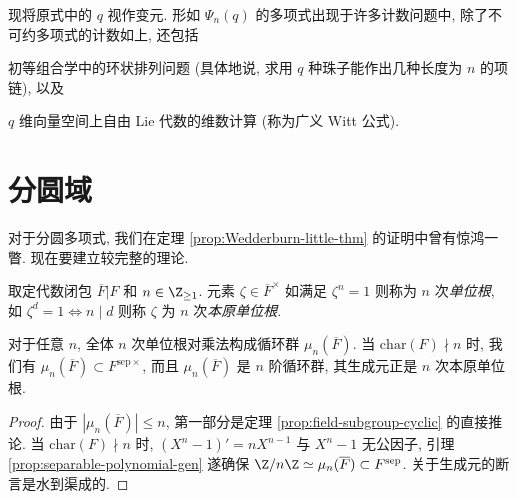 现将原式中的 $q$ 视作变元. 形如 $\Psi_n(q)$ 的多项式出现于许多计数问题中, 除了不可约多项式的计数如上, 还包括
\begin{inparaenum}[(a)]
	\item 初等组合学中的环状排列问题 (具体地说, 求用 $q$ 种珠子能作出几种长度为 $n$ 的项链), 以及
	\item $q$ 维向量空间上自由 Lie 代数的维数计算 (称为广义 Witt 公式).
\end{inparaenum}

\section{分圆域}\label{sec:cyclotomic-ext}
对于分圆多项式, 我们在定理 \ref{prop:Wedderburn-little-thm} 的证明中曾有惊鸿一瞥. 现在要建立较完整的理论.

\begin{definition}
	取定代数闭包 $\overline{F}|F$ 和 $n \in \Z_{\geq 1}$. 元素 $\zeta \in \overline{F}^\times$ 如满足 $\zeta^n = 1$ 则称为 $n$ 次\emph{单位根}, 如 $\zeta^d = 1 \iff n \mid d$ 则称 $\zeta$ 为 $n$ 次\emph{本原单位根}.
\end{definition}

\begin{proposition}
	对于任意 $n$, 全体 $n$ 次单位根对乘法构成循环群 $\mu_n(\overline{F})$. 当 $\mathrm{char}(F) \nmid n$ 时, 我们有 $\mu_n(\overline{F}) \subset F^{\mathrm{sep}\times}$, 而且 $\mu_n(\overline{F})$ 是 $n$ 阶循环群, 其生成元正是 $n$ 次本原单位根.
\end{proposition}
\begin{proof}
	由于 $|\mu_n(\overline{F})| \leq n$, 第一部分是定理 \ref{prop:field-subgroup-cyclic} 的直接推论. 当 $\text{char}(F) \nmid n$ 时, $(X^n-1)' = nX^{n-1}$ 与 $X^n-1$ 无公因子, 引理 \ref{prop:separable-polynomial-gen} 遂确保 $\Z/n\Z \simeq \mu_n(\overline{F}) \subset F^\text{sep}$. 关于生成元的断言是水到渠成的.
\end{proof}

